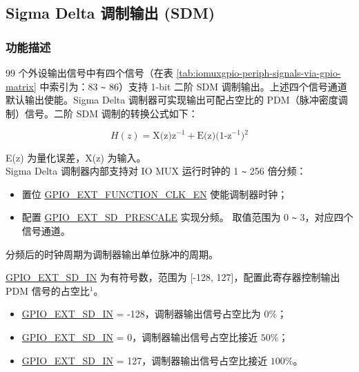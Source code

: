 \documentclass[main\_\_CN.tex]{subfiles}
\begin{document}
\subsection{Sigma Delta 调制输出 (SDM)}

\subsubsection{功能描述}

99 个外设输出信号中有四个信号（在表 \ref{tab:iomuxgpio-periph-signals-via-gpio-matrix} 中索引为：83 \verb+~+ 86）支持 1-bit 二阶 SDM 调制输出。上述四个信号通道默认输出使能。Sigma Delta 调制器可实现输出可配占空比的 PDM（脉冲密度调制）信号。二阶 SDM 调制的转换公式如下：

\[
    H(z)=\textrm{X(z)z$^{-1}$} + \textrm{E(z)(1-z$^{-1}$)$^{2}$}
    \]

E(z) 为量化误差，X(z) 为输入。\\
Sigma Delta 调制器内部支持对 IO MUX 运行时钟的 1 \verb+~+ 256 倍分频：

\begin{itemize}
    \item 置位 \hyperref[fielddesc:GPIOSDFUNCTIONCLKEN]{GPIO\_EXT\_FUNCTION\_CLK\_EN} 使能调制器时钟；
    \item 配置 \hyperref[fielddesc:GPIOSDSD0PRESCALE]{GPIO\_EXT\_SD\_PRESCALE} 实现分频。 取值范围为 0 \verb+~+ 3，对应四个信号通道。
\end{itemize}

分频后的时钟周期为调制器输出单位脉冲的周期。

\hyperref[fielddesc:GPIOSDSD0IN]{GPIO\_EXT\_SD\_IN} 为有符号数，范围为 [-128, 127]，配置此寄存器控制输出 PDM 信号的占空比$^{1}$。

\begin{itemize}
    \item \hyperref[fielddesc:GPIOSDSD0IN]{GPIO\_EXT\_SD\_IN} = -128，调制器输出信号占空比为 \begin{math}0\% \end{math}；
    \item \hyperref[fielddesc:GPIOSDSD0IN]{GPIO\_EXT\_SD\_IN} = 0，调制器输出信号占空比接近 \begin{math}50\% \end{math}；
    \item \hyperref[fielddesc:GPIOSDSD0IN]{GPIO\_EXT\_SD\_IN} = 127，调制器输出信号占空比接近 \begin{math}100\% \end{math}。
\end{itemize}
\end{document}
